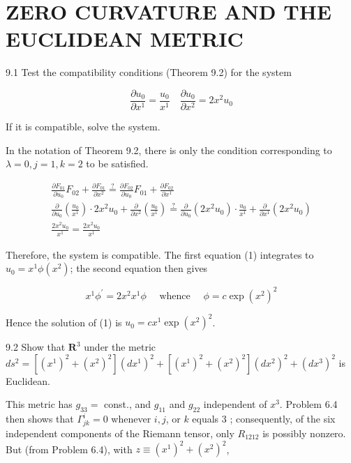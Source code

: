 \documentclass[10pt]{article}
\begin{document}
\section*{ZERO CURVATURE AND THE EUCLIDEAN METRIC}
9.1 Test the compatibility conditions (Theorem 9.2) for the system


\begin{equation*}
\frac{\partial u_{0}}{\partial x^{1}}=\frac{u_{0}}{x^{1}} \quad \frac{\partial u_{0}}{\partial x^{2}}=2 x^{2} u_{0} \tag{1}
\end{equation*}


If it is compatible, solve the system.

In the notation of Theorem 9.2, there is only the condition corresponding to $\lambda=0, j=1, k=2$ to be satisfied.

$$
\begin{gathered}
\frac{\partial F_{01}}{\partial u_{0}} F_{02}+\frac{\partial F_{01}}{\partial x^{2}} \stackrel{?}{=} \frac{\partial F_{02}}{\partial u_{0}} F_{01}+\frac{\partial F_{02}}{\partial x^{1}} \\
\frac{\partial}{\partial u_{0}}\left(\frac{u_{0}}{x^{1}}\right) \cdot 2 x^{2} u_{0}+\frac{\partial}{\partial x^{2}}\left(\frac{u_{0}}{x^{1}}\right) \stackrel{?}{=} \frac{\partial}{\partial u_{0}}\left(2 x^{2} u_{0}\right) \cdot \frac{u_{0}}{x^{1}}+\frac{\partial}{\partial x^{1}}\left(2 x^{2} u_{0}\right) \\
\frac{2 x^{2} u_{0}}{x^{1}}=\frac{2 x^{2} u_{0}}{x^{1}}
\end{gathered}
$$

Therefore, the system is compatible. The first equation (1) integrates to $u_{0}=x^{1} \phi\left(x^{2}\right)$; the second equation then gives

$$
x^{1} \phi^{\prime}=2 x^{2} x^{1} \phi \quad \text { whence } \quad \phi=c \exp \left(x^{2}\right)^{2}
$$

Hence the solution of (1) is $u_{0}=c x^{1} \exp \left(x^{2}\right)^{2}$.

9.2 Show that $\mathbf{R}^{3}$ under the metric $d s^{2}=\left[\left(x^{1}\right)^{2}+\left(x^{2}\right)^{2}\right]\left(d x^{1}\right)^{2}+\left[\left(x^{1}\right)^{2}+\left(x^{2}\right)^{2}\right]\left(d x^{2}\right)^{2}+\left(d x^{3}\right)^{2}$ is Euclidean.

This metric has $g_{33}=$ const., and $g_{11}$ and $g_{22}$ independent of $x^{3}$. Problem 6.4 then shows that $\Gamma_{j k}^{i}=0$ whenever $i, j$, or $k$ equals 3 ; consequently, of the six independent components of the Riemann tensor, only $R_{1212}$ is possibly nonzero. But (from Problem 6.4), with $z \equiv\left(x^{1}\right)^{2}+\left(x^{2}\right)^{2}$,
\end{document}
